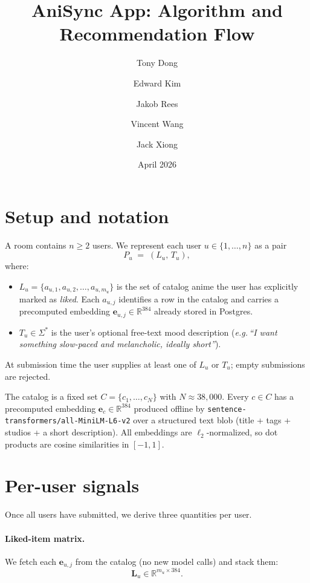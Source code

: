 \documentclass[11pt]{article}
\title{AniSync App: Algorithm and Recommendation Flow}
\author{Tony Dong \and Edward Kim \and Jakob Rees \and Vincent Wang \and Jack Xiong}
\date{April 2026}
\begin{document}
\maketitle

\section{Setup and notation}

A room contains $n \geq 2$ users. We represent each user $u \in \{1, \dots, n\}$
as a pair
\[
  P_u \;=\; (L_u,\, T_u),
\]
where:
\begin{itemize}[leftmargin=2em]
  \item $L_u = \{a_{u,1}, a_{u,2}, \dots, a_{u,m_u}\}$ is the set of catalog
        anime the user has explicitly marked as \emph{liked}. Each
        $a_{u,j}$ identifies a row in the catalog and carries a
        precomputed embedding $\mathbf{e}_{u,j} \in \mathbb{R}^{384}$
        already stored in Postgres.
  \item $T_u \in \Sigma^{*}$ is the user's optional free-text mood
        description (\textit{e.g.\,``I want something slow-paced and
        melancholic, ideally short''}).
\end{itemize}

At submission time the user supplies at least one of $L_u$ or $T_u$;
empty submissions are rejected.

The catalog is a fixed set $C = \{c_1, \dots, c_N\}$ with $N \approx 38{,}000$.
Every $c \in C$ has a precomputed embedding
$\mathbf{e}_c \in \mathbb{R}^{384}$ produced offline by
\texttt{sentence-transformers/all-MiniLM-L6-v2} over a structured text blob
(title + tags + studios + a short description). All embeddings are
$\ell_2$-normalized, so dot products are cosine similarities in $[-1, 1]$.

\section{Per-user signals}

Once all users have submitted, we derive three quantities per user.

\paragraph{Liked-item matrix.}
We fetch each $\mathbf{e}_{u,j}$ from the catalog (no new model calls)
and stack them:
\[
  \mathbf{L}_u \in \mathbb{R}^{m_u \times 384}.
\]
\end{document}
